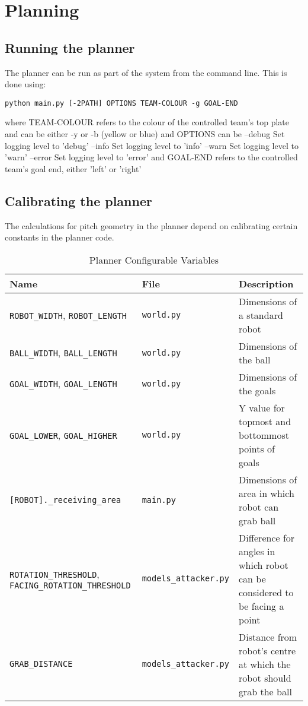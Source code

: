 \section{Planning}
\lstset{language=Bash, showstringspaces=false}

\subsection{Running the planner}

The planner can be run as part of the system from the command line. This is done using:

\begin{lstlisting}
python main.py [-2PATH] OPTIONS TEAM-COLOUR -g GOAL-END
\end{lstlisting}

where TEAM-COLOUR refers to the colour of the controlled team's top plate and can be either -y or -b (yellow or blue)
and OPTIONS can be --debug Set logging level to 'debug'
	   	   --info  Set logging level to 'info'
		   --warn  Set logging level to 'warn'
		   --error Set logging level to 'error'
and GOAL-END refers to the controlled team's goal end, either 'left' or 'right'

\subsection{Calibrating the planner}

The calculations for pitch geometry in the planner depend on calibrating certain constants in the planner code.


\begin{table}[H]
\begin{tabularx}{\textwidth}{ XlX }
\toprule
\textbf{Name} & \textbf{File} & \textbf{Description} \\
\midrule
\verb|ROBOT_WIDTH|, \verb|ROBOT_LENGTH| & \texttt{world.py} & Dimensions of a standard robot \\
\verb|BALL_WIDTH|, \verb|BALL_LENGTH| & \texttt{world.py} & Dimensions of the ball \\
\verb|GOAL_WIDTH|, \verb|GOAL_LENGTH| & \texttt{world.py} & Dimensions of the goals \\
\verb|GOAL_LOWER|, \verb|GOAL_HIGHER| & \texttt{world.py} & Y value for topmost and bottommost points of goals \\
\verb|[ROBOT]._receiving_area| & \texttt{main.py} & Dimensions of area in which robot can grab ball \\
\verb|ROTATION_THRESHOLD|, \verb|FACING_ROTATION_THRESHOLD| &\texttt{models\_attacker.py} & Difference for angles in which robot can be considered to be facing a point \\
\verb|GRAB_DISTANCE| & \texttt{models\_attacker.py} & Distance from robot's centre at which the robot should grab the ball \\
\bottomrule
\end{tabularx}
\caption{Planner Configurable Variables}
\end{table}
